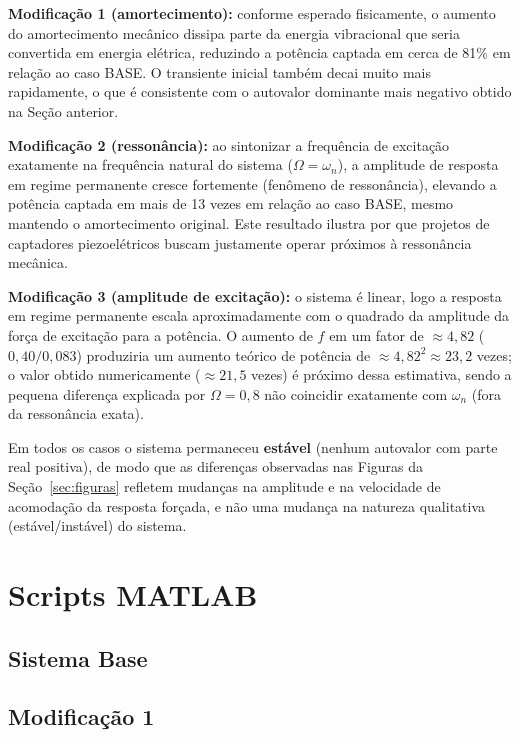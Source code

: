 \documentclass[a4paper,11pt]{article}
\begin{document}
\textbf{Modificação 1 (amortecimento):} conforme esperado fisicamente, o
aumento do amortecimento mecânico dissipa parte da energia vibracional
que seria convertida em energia elétrica, reduzindo a potência captada em
cerca de 81\% em relação ao caso BASE. O transiente inicial também decai
muito mais rapidamente, o que é consistente com o autovalor dominante
mais negativo obtido na Seção anterior.

\textbf{Modificação 2 (ressonância):} ao sintonizar a frequência de
excitação exatamente na frequência natural do sistema ($\Omega=\omega_n$),
a amplitude de resposta em regime permanente cresce fortemente (fenômeno
de ressonância), elevando a potência captada em mais de 13 vezes em
relação ao caso BASE, mesmo mantendo o amortecimento original. Este
resultado ilustra por que projetos de captadores piezoelétricos buscam
justamente operar próximos à ressonância mecânica.

\textbf{Modificação 3 (amplitude de excitação):} o sistema é linear, logo
a resposta em regime permanente escala aproximadamente com o quadrado da
amplitude da força de excitação para a potência. O aumento de $f$ em um
fator de $\approx4{,}82$ ($0{,}40/0{,}083$) produziria um aumento teórico
de potência de $\approx 4{,}82^2 \approx 23{,}2$ vezes; o valor obtido
numericamente ($\approx 21{,}5$ vezes) é próximo dessa estimativa, sendo a
pequena diferença explicada por $\Omega=0{,}8$ não coincidir exatamente
com $\omega_n$ (fora da ressonância exata).

Em todos os casos o sistema permaneceu \textbf{estável} (nenhum autovalor
com parte real positiva), de modo que as diferenças observadas nas
Figuras da Seção~\ref{sec:figuras} refletem mudanças na amplitude e na
velocidade de acomodação da resposta forçada, e não uma mudança na
natureza qualitativa (estável/instável) do sistema.

\section{Scripts MATLAB}
\label{sec:scripts}

\subsection{Sistema Base}


\subsection{Modificação 1}

\end{document}
